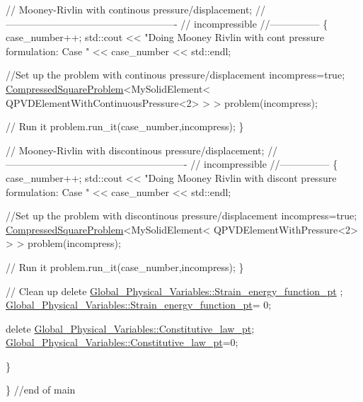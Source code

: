 \begin{DoxyCodeInclude}
    

  \textcolor{comment}{// Mooney-Rivlin with continous pressure/displacement; }
  \textcolor{comment}{//----------------------------------------------------}
  \textcolor{comment}{// incompressible}
  \textcolor{comment}{//---------------}
  \{
   case\_number++;
   std::cout 
    << \textcolor{stringliteral}{"Doing Mooney Rivlin with cont pressure formulation: Case "}
    << case\_number << std::endl; 
   
   \textcolor{comment}{//Set up the problem with continous pressure/displacement}
   incompress=\textcolor{keyword}{true};
   \hyperlink{classCompressedSquareProblem}{CompressedSquareProblem}<MySolidElement<
    QPVDElementWithContinuousPressure<2> > > 
    problem(incompress); 
     
   \textcolor{comment}{// Run it}
   problem.run\_it(case\_number,incompress);
  \}
    

  \textcolor{comment}{// Mooney-Rivlin with discontinous pressure/displacement; }
  \textcolor{comment}{//-------------------------------------------------------}
  \textcolor{comment}{// incompressible}
  \textcolor{comment}{//---------------}
  \{
   case\_number++;
   std::cout 
    << \textcolor{stringliteral}{"Doing Mooney Rivlin with discont pressure formulation: Case "}
    << case\_number << std::endl; 
   
   \textcolor{comment}{//Set up the problem with discontinous pressure/displacement}
   incompress=\textcolor{keyword}{true};
   \hyperlink{classCompressedSquareProblem}{CompressedSquareProblem}<MySolidElement<
    QPVDElementWithPressure<2> > > 
    problem(incompress); 
     
   \textcolor{comment}{// Run it}
   problem.run\_it(case\_number,incompress);
  \}


  \textcolor{comment}{// Clean up}
  \textcolor{keyword}{delete}  \hyperlink{namespaceGlobal__Physical__Variables_a73135f793690b4386bf83bbefc7bf310}{Global\_Physical\_Variables::Strain\_energy\_function\_pt}
      ;
  \hyperlink{namespaceGlobal__Physical__Variables_a73135f793690b4386bf83bbefc7bf310}{Global\_Physical\_Variables::Strain\_energy\_function\_pt}=
      0;
  
  \textcolor{keyword}{delete} \hyperlink{namespaceGlobal__Physical__Variables_a2a37fb040c832ee7a086bb13bb02a100}{Global\_Physical\_Variables::Constitutive\_law\_pt};
  \hyperlink{namespaceGlobal__Physical__Variables_a2a37fb040c832ee7a086bb13bb02a100}{Global\_Physical\_Variables::Constitutive\_law\_pt}=0;
  
 \}
   
\} \textcolor{comment}{//end of main}

\end{DoxyCodeInclude}
 

